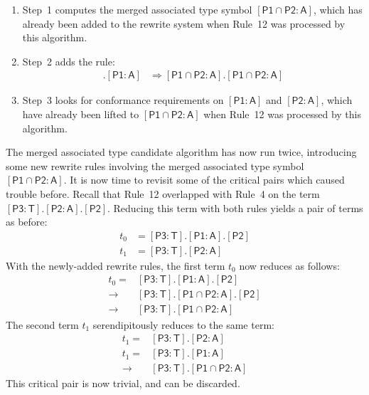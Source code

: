 \documentclass[headsepline,bibliography=totoc]{scrreport}
\newcommand{\namesym}[1]{\mathsf{#1}}
\newcommand{\proto}[1]{\bm{\mathsf{#1}}}
\newcommand{\protosym}[1]{[\proto{#1}]}
\newcommand{\assocsym}[2]{[\proto{#1}\colon\namesym{#2}]}
\theoremstyle{definition}
\theoremstyle{definition}
\theoremstyle{definition}
\begin{document}
\begin{enumerate}
\item Step~1 computes the merged associated type symbol $[\proto{P1}\cap\proto{P2}\colon\namesym{A}]$, which has already been added to the rewrite system when Rule~12 was processed by this algorithm.
\item Step~2 adds the rule:
\begin{align}
[\proto{P1}\cap\proto{P2}\colon\namesym{A}].\assocsym{P1}{A}&\Rightarrow [\proto{P1}\cap\proto{P2}\colon\namesym{A}].[\proto{P1}\cap\proto{P2}\colon\namesym{A}]\tag{19}
\end{align}
\item Step~3 looks for conformance requirements on $\assocsym{P1}{A}$ and $\assocsym{P2}{A}$, which have already been lifted to $[\proto{P1}\cap\proto{P2}\colon\namesym{A}]$ when Rule~12 was processed by this algorithm.
\end{enumerate}

The merged associated type candidate algorithm has now run twice, introducing some new rewrite rules involving the merged associated type symbol $[\proto{P1}\cap\proto{P2}\colon\namesym{A}]$. It is now time to revisit some of the critical pairs which caused trouble before. Recall that Rule~12 overlapped with Rule~4 on the term $\assocsym{P3}{T}.\assocsym{P2}{A}.\protosym{P2}$. Reducing this term with both rules yields a pair of terms as before:
\begin{align*}
t_0&=\assocsym{P3}{T}.\assocsym{P1}{A}.\protosym{P2}\\
t_1&=\assocsym{P3}{T}.\assocsym{P2}{A}
\end{align*}
With the newly-added rewrite rules, the first term $t_0$ now reduces as follows:
\begin{align}
t_0=&\assocsym{P3}{T}.\assocsym{P1}{A}.\protosym{P2}\nonumber\\
\rightarrow&\assocsym{P3}{T}.[\proto{P1}\cap\proto{P2}\colon\namesym{A}].\protosym{P2}\tag{Rule 13}\\
\rightarrow&\assocsym{P3}{T}.[\proto{P1}\cap\proto{P2}\colon\namesym{A}]\tag{Rule 15}
\end{align}
The second term $t_1$ serendipitously reduces to the same term:
\begin{align}
t_1=&\assocsym{P3}{T}.\assocsym{P2}{A}\nonumber\\
t_1=&\assocsym{P3}{T}.\assocsym{P1}{A}\tag{Rule 12}\\
\rightarrow&\assocsym{P3}{T}.[\proto{P1}\cap\proto{P2}\colon\namesym{A}]\tag{Rule 13}
\end{align}
This critical pair is now trivial, and can be discarded.
\end{document}
